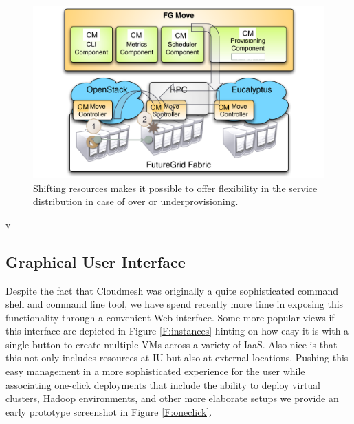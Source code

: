 \documentclass{tex/sig-alternate}
\begin{document}
{\begin{figure}[htb]
  \centering
    \includegraphics[width=1.0\columnwidth]{images/shift2.pdf}
  \caption{Shifting resources makes it possible to offer flexibility
    in the service distribution in case of over or underprovisioning.}\label{F:shift}
\end{figure}
v

\subsection{Graphical User Interface}


Despite the fact that Cloudmesh was originally a quite sophisticated command shell and command line tool, we have spend recently more time in exposing this functionality through a convenient Web interface. Some more popular views if this interface are depicted in Figure \ref{F:instances} hinting on how easy it is with a single button to create multiple VMs across a variety of IaaS. Also nice is that this not only includes resources at IU but also at external locations. Pushing this easy management in a more sophisticated experience for the user while associating one-click deployments that include the ability to deploy virtual clusters, Hadoop environments, and other more elaborate setups we provide an early prototype screenshot in Figure \ref{F:oneclick}.


}
\end{document}
